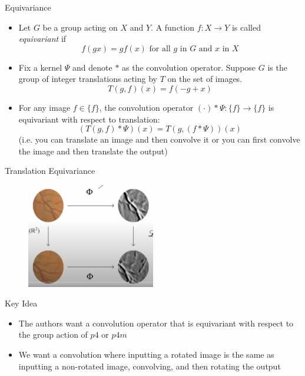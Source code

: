\documentclass{beamer}
\begin{document}
\begin{frame}{Equivariance}
    \begin{itemize}
        \item Let $G$ be a group acting on $X$ and $Y$.  A function $f:X \to Y$ is called \emph{equivariant} if 
        $$f(gx) = gf(x) \text{ for all $g$ in $G$ and $x$ in $X$}$$
        \item Fix a kernel $\Psi$ and denote $*$ as the convolution operator.  Suppose $G$ is the group of integer translations acting by $T$ on the set of images. 
         $$T(g,f)(x)= f(-g + x)$$ 
        \item For any image $f\in \{f\}$, the convolution operator $(\cdot)*\Psi: \{f\} \to \{f\}$ is equivariant with respect to translation:
        $$ (T(g, f) * \Psi)(x) = T(g, (f * \Psi))(x)$$
        (i.e. you can translate an image and then convolve it or you can first convolve the image and then translate the output)
    \end{itemize}
\end{frame}

\begin{frame}{Translation Equivariance}
    \begin{figure}
        \centering
        \includegraphics[width=0.5\textwidth, height=0.5\textheight]{Screenshot 2024-01-13 at 11.31.21 AM.png}
    \end{figure}
\end{frame}

\begin{frame}{Key Idea}
    \begin{itemize}
        \item The authors want a convolution operator that is equivariant with respect to the group action of $p4$ or $p4m$
        \item We want a convolution where inputting a rotated image is the same as inputting a non-rotated image, convolving, and then rotating the output
    \end{itemize}
\end{frame}
\end{document}
